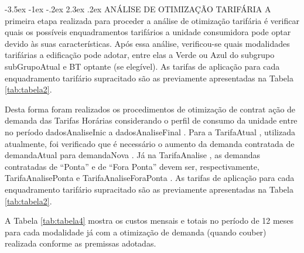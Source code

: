 \documentclass[a4paper,12pt]{abntex2}
\makeatletter
\renewcommand\chapter{\@startsection{chapter}{0}{\z@}%
  {-3.5ex \@plus -1ex \@minus -.2ex}%
  {2.3ex \@plus.2ex}%
  {\normalfont\large\bfseries}}
\makeatother
\begin{document}
\chapter{ANÁLISE DE OTIMIZAÇÃO TARIFÁRIA}
A primeira etapa realizada para proceder a análise de otimização tarifária é verificar quais 
os possíveis enquadramentos tarifários a unidade consumidora pode optar devido às suas 
características.  Após  essa  análise,  verificou-se quais modalidades tarifárias a  edificação  pode  adotar, entre elas a Verde ou Azul do subgrupo {{ subGrupoAtual }} e BT optante (se elegível). As tarifas de aplicação para 
cada enquadramento tarifário supracitado são as previamente apresentadas na Tabela \ref{tab:tabela2}.

Desta forma  foram realizados os procedimentos de otimização de contrat ação de demanda 
das  Tarifas  Horárias  considerando  o  perfil  de  consumo  da  unidade  entre  no  período 
{{ dadosAnaliseInic }}  a  {{ dadosAnaliseFinal }}. Para a {{ TarifaAtual }}, utilizada atualmente, foi verificado 
que é necessário  o aumento  da demanda contratada de  {{ demandaAtual }} para  {{ demandaNova }}. Já na {{ TarifaAnalise }},  as  demandas  contratadas  de  “Ponta”  e  de  “Fora  Ponta”  devem  ser, 
respectivamente,  {{ TarifaAnalisePonta }} e  {{ TarifaAnaliseForaPonta }}.  As tarifas de aplicação para cada enquadramento tarifário 
supracitado são as previamente apresentadas na Tabela \ref{tab:tabela2}.

A  Tabela  \ref{tab:tabela4}  mostra  os  custos  mensais  e  totais  no  período  de  12  meses  para  cada 
modalidade  já  com  a  otimização  de  demanda  (quando  couber)  realizada  conforme  as 
premissas adotadas.
\end{document}
